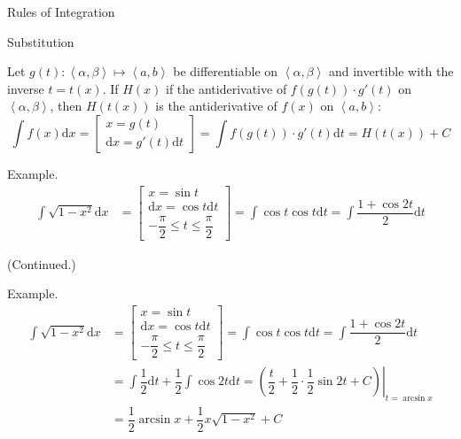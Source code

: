 \documentclass{beamer}
\begin{document}
    \begin{frame}[t]{Rules of Integration}
        \begin{block}{Substitution}
            \par Let $g(t): \left\langle\alpha,\beta\right\rangle\mapsto \left\langle a, b\right\rangle$ be differentiable on $\left\langle\alpha,\beta\right\rangle$ and invertible with the inverse $t = t(x)$. If $H(x)$ if the antiderivative of $f(g(t))\cdot g'(t)$ on $\left\langle\alpha,\beta\right\rangle$, then $H(t(x))$ is the antiderivative of $f(x)$ on $\left\langle a, b\right\rangle$: $$\int f(x)\mathrm{d}x = \left[\begin{array}{c}
                x = g(t) \\ \mathrm{d}x = g'(t)\mathrm{d}t
            \end{array}\right] = \int f(g(t))\cdot g'(t)\mathrm{d}t = H(t(x)) + C$$
        \end{block}
        \par \textcolor{yy}{Example.} 
        \begin{equation*}
            \begin{aligned}
                \int \sqrt{1-x^2}\mathrm{d}x & = \left[\begin{array}{c} x = \sin t\\\mathrm{d}x = \cos t \mathrm{d}t \\ -\dfrac{\pi}{2} \leqslant t \leqslant \dfrac{\pi}{2}\end{array}\right] = \int \cos t \cos t \mathrm{d}t = \int \dfrac{1+\cos 2t}{2}\mathrm{d}t
            \end{aligned}
        \end{equation*}
    \end{frame}
    \begin{frame}[t]
        \par (Continued.)
        \par \textcolor{yy}{Example.} 
        \begin{equation*}
            \begin{aligned}
                \int \sqrt{1-x^2}\mathrm{d}x & = \left[\begin{array}{c} x = \sin t\\\mathrm{d}x = \cos t \mathrm{d}t \\ -\dfrac{\pi}{2} \leqslant t \leqslant \dfrac{\pi}{2}\end{array}\right] = \int \cos t \cos t \mathrm{d}t = \int \dfrac{1+\cos 2t}{2}\mathrm{d}t \\
                & = \int \dfrac{1}{2}\mathrm{d}t + \dfrac{1}{2}\int \cos 2t \mathrm{d}t = \left.\left(\dfrac{t}{2} + \dfrac{1}{2}\cdot\dfrac{1}{2}\sin 2t + C\right)\right|_{t = \arcsin x} \\
                & = \dfrac{1}{2}\arcsin x + \dfrac{1}{2}x\sqrt{1-x^2} + C
            \end{aligned}
        \end{equation*}
    \end{frame}
\end{document}
